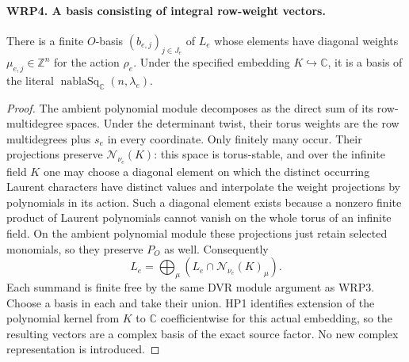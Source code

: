 \documentclass[11pt,a4paper]{article}
\numberwithin{equation}{section}
\theoremstyle{remark}\newtheorem{remark}[theorem]{Remark}
\begin{document}
\paragraph{WRP4. A basis consisting of integral row-weight vectors.}
\label{claim:WRP4}
There is a finite $O$-basis $(b_{e,\allowbreak{} j})_{j\in J_e}$ of $L_e$
whose elements have diagonal weights
$\mu_{e,\allowbreak{} j}\in\mathbb Z^n$ for the action
$\rho_e$.  Under the specified embedding
$K\hookrightarrow\mathbb C$, it is a basis of the literal
$\operatorname{nablaSq}_{\mathbb C}(n,\lambda_e)$.
\begin{proof}
The ambient polynomial module decomposes as the direct sum
of its row-multidegree spaces.  Under the determinant twist,
their torus weights are the row multidegrees plus $s_e$ in
every coordinate.  Only finitely many occur.  Their
projections preserve $\mathcal N_{\nu_e}(K)$: this space
is torus-stable, and over the infinite field $K$ one may
choose a diagonal element on which the distinct occurring
Laurent characters have distinct values and interpolate
the weight projections by polynomials in its action.
Such a diagonal element exists because a nonzero finite
product of Laurent polynomials cannot vanish on the whole
torus of an infinite field.  On the ambient polynomial
module these projections just retain selected monomials,
so they preserve $P_O$ as well.  Consequently
\[
                 L_e=\bigoplus_\mu
                         (L_e\cap\mathcal N_{\nu_e}(K)_\mu).
\]
Each summand is finite free by the same DVR module argument
as WRP3.  Choose a basis in each and take their union.
HP1 identifies extension of the polynomial kernel from
$K$ to $\mathbb C$ coefficientwise for this actual embedding,
so the resulting vectors are a complex basis of the exact
source factor.  No new complex representation is introduced.
\end{proof}

\end{document}
